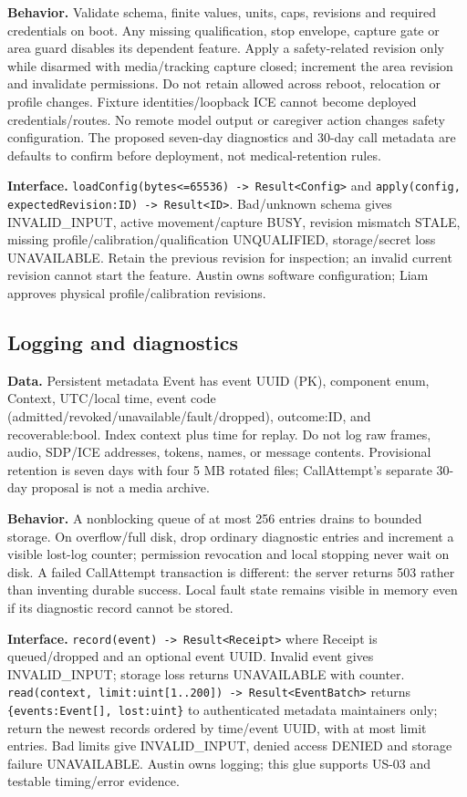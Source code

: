 \documentclass[12pt,letterpaper]{article}
\newcommand{\field}[1]{\texttt{#1}}
\begin{document}
\textbf{Behavior.} Validate schema, finite values, units, caps, revisions and required credentials on boot. Any missing qualification, stop envelope, capture gate or area guard disables its dependent feature. Apply a safety-related revision only while disarmed with media/tracking capture closed; increment the area revision and invalidate permissions. Do not retain allowed across reboot, relocation or profile changes. Fixture identities/loopback ICE cannot become deployed credentials/routes. No remote model output or caregiver action changes safety configuration. The proposed seven-day diagnostics and 30-day call metadata are defaults to confirm before deployment, not medical-retention rules.

\textbf{Interface.} \field{loadConfig(bytes<=65536) -> Result<Config>} and \field{apply(config, expectedRevision:ID) -> Result<ID>}. Bad/unknown schema gives INVALID\_\allowbreak{}INPUT, active movement/capture BUSY, revision mismatch STALE, missing profile/calibration/qualification UNQUALIFIED, storage/secret loss UNAVAILABLE. Retain the previous revision for inspection; an invalid current revision cannot start the feature. Austin owns software configuration; Liam approves physical profile/calibration revisions.

\subsection*{Logging and diagnostics}
\textbf{Data.} Persistent metadata Event has event UUID (PK), component enum, Context, UTC/local time, event code (admitted/revoked/unavailable/fault/dropped), outcome:ID, and recoverable:bool. Index context plus time for replay. Do not log raw frames, audio, SDP/ICE addresses, tokens, names, or message contents. Provisional retention is seven days with four 5 MB rotated files; CallAttempt's separate 30-day proposal is not a media archive.

\textbf{Behavior.} A nonblocking queue of at most 256 entries drains to bounded storage. On overflow/full disk, drop ordinary diagnostic entries and increment a visible lost-log counter; permission revocation and local stopping never wait on disk. A failed CallAttempt transaction is different: the server returns 503 rather than inventing durable success. Local fault state remains visible in memory even if its diagnostic record cannot be stored.

\textbf{Interface.} \field{record(event) -> Result<Receipt>} where Receipt is queued/dropped and an optional event UUID. Invalid event gives INVALID\_\allowbreak{}INPUT; storage loss returns UNAVAILABLE with counter. \field{read(context, limit:uint[1..200]) -> Result<EventBatch>} returns \field{\{events:Event[], lost:uint\}} to authenticated metadata maintainers only; return the newest records ordered by time/event UUID, with at most limit entries. Bad limits give INVALID\_\allowbreak{}INPUT, denied access DENIED and storage failure UNAVAILABLE. Austin owns logging; this glue supports US-03 and testable timing/error evidence.
\end{document}
